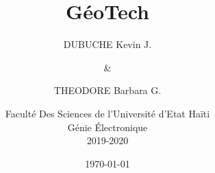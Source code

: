 \documentclass[a4paper,12pt]{report}
\begin{document}


\title{\textbf{\huge{GéoTech}}}
\author{
  DUBUCHE Kevin J.

  \and
  \&
  \and
  THEODORE Barbara G.
  \and
  Faculté Des Sciences de l'Université d'Etat Haïti \\ 
   Génie Électronique \\
   2019-2020
}
\date{\today}

\maketitle


\tableofcontents
\newpage
{}























\end{document}
